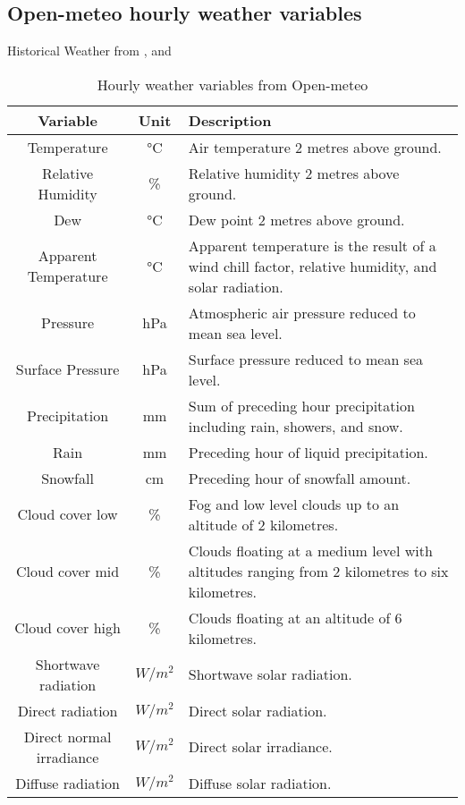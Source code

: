 \subsection{Open-meteo hourly weather variables \cite{Zippenfenig_Open-Meteo}}
Historical Weather \cite{Zippenfenig_Open-Meteo} from \cite{Hersbach_ERA5}, \cite{Munoz_ERA5_LAND} and \cite{Schimanke_CERRA}
\begin{table}[h!]
\caption{Hourly weather variables from Open-meteo}
\centering
\small
\begin{tabular}{|c|c|p{10cm}|} %
\hline
\textbf{Variable} & \textbf{Unit} & \textbf{Description}\\
\hline
Temperature & °C & Air temperature 2 metres above ground. \\
\hline
Relative Humidity & \% & Relative humidity 2 metres above ground. \\
\hline
Dew & °C & Dew point 2 metres above ground. \\
\hline
Apparent Temperature & °C & Apparent temperature is the 
result of a wind chill factor, relative humidity, and solar radiation. \\
\hline
Pressure & hPa & Atmospheric air pressure reduced to mean sea level. \\
\hline
Surface Pressure & hPa & Surface pressure reduced to mean sea level. \\
\hline
Precipitation & mm & Sum of preceding hour precipitation including rain, showers, and snow. \\
\hline
Rain & mm & Preceding hour of liquid precipitation. \\
\hline
Snowfall & cm & Preceding hour of snowfall amount. \\
\hline
Cloud cover low & \% & Fog and low level clouds up to an altitude of 2 kilometres. \\
\hline
Cloud cover mid & \% & Clouds floating at a medium level with altitudes ranging from 2 kilometres to six kilometres. \\
\hline
Cloud cover high & \% & Clouds floating at an altitude of 6 kilometres. \\
\hline
Shortwave radiation & $W/m^2$ & Shortwave solar radiation.  \\
\hline
Direct radiation & $W/m^2$ & Direct solar radiation. \\
\hline
Direct normal irradiance & $W/m^2$ & Direct solar irradiance.  \\
\hline
Diffuse radiation & $W/m^2$ & Diffuse solar radiation.  \\

\end{tabular}
\end{table}
